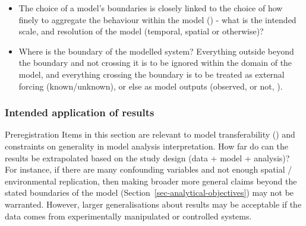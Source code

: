 \documentclass[
]{article}
\providecommand{\tightlist}{%
  \setlength{\itemsep}{0pt}\setlength{\parskip}{0pt}}
\begin{document}
\begin{tcolorbox}[enhanced jigsaw, opacitybacktitle=0.6, bottomrule=.15mm, leftrule=.75mm, rightrule=.15mm, colbacktitle=quarto-callout-caution-color!10!white, toprule=.15mm, titlerule=0mm, left=2mm, colframe=quarto-callout-caution-color-frame, breakable, title=\textcolor{quarto-callout-caution-color}{\faFire}\hspace{0.5em}{Preregistration Item}, opacityback=0, coltitle=black, bottomtitle=1mm, colback=white, toptitle=1mm, arc=.35mm]

\begin{itemize}
\tightlist
\item[$\square$]
  The choice of a model's boundaries is closely linked to the choice of
  how finely to aggregate the behaviour within the model
  () - what is the
  intended scale, and resolution of the model (temporal, spatial or
  otherwise)?
\item[$\square$]
  Where is the boundary of the modelled system? Everything outside
  beyond the boundary and not crossing it is to be ignored within the
  domain of the model, and everything crossing the boundary is to be
  treated as external forcing (known/unknown), or else as model outputs
  (observed, or not, ).
\end{itemize}

\end{tcolorbox}

\subsubsection{Intended application of
results}\label{intended-application-of-results}

\begin{tcolorbox}[enhanced jigsaw, opacitybacktitle=0.6, bottomrule=.15mm, leftrule=.75mm, rightrule=.15mm, colbacktitle=quarto-callout-note-color!10!white, toprule=.15mm, titlerule=0mm, left=2mm, colframe=quarto-callout-note-color-frame, breakable, title=\textcolor{quarto-callout-note-color}{\faInfo}\hspace{0.5em}{Explanation}, opacityback=0, coltitle=black, bottomtitle=1mm, colback=white, toptitle=1mm, arc=.35mm]

Preregistration Items in this section are relevant to model
transferability () and
constraints on generality in model analysis interpretation. How far do
can the results be extrapolated based on the study design (data + model
+ analysis)? For instance, if there are many confounding variables and
not enough spatial / environmental replication, then making broader more
general claims beyond the stated boundaries of the model
(Section~\ref{sec-analytical-objectives}) may not be warranted. However,
larger generalisations about results may be acceptable if the data comes
from experimentally manipulated or controlled systems.

\end{tcolorbox}
\end{document}
